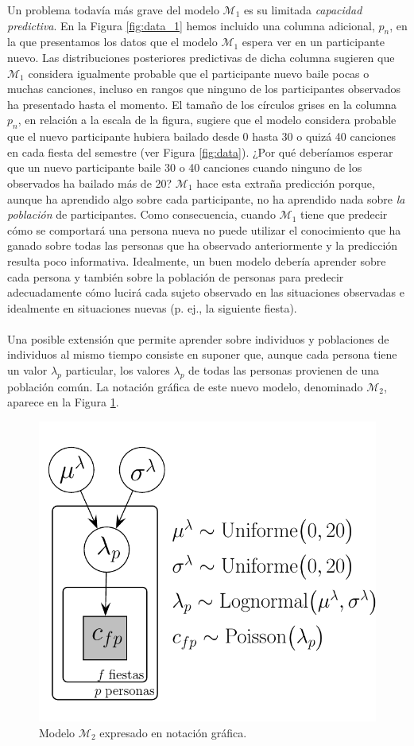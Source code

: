 \documentclass{article}
\begin{document}
\indent Un problema todavía más grave del modelo $\mathcal M_1$ es su limitada \emph{capacidad predictiva}. En la Figura \ref{fig:data_1} hemos incluido una columna adicional, $p_n$, en la que presentamos los datos que el modelo $\mathcal M_1$ espera ver en un participante nuevo. Las distribuciones posteriores predictivas de dicha columna sugieren que $\mathcal M_1$ considera igualmente probable que el participante nuevo baile pocas o muchas canciones, incluso en rangos que ninguno de los participantes observados ha presentado hasta el momento. El tamaño de los círculos grises en la columna $p_n$, en relación a la escala de la figura, sugiere que el modelo considera probable que el nuevo participante hubiera bailado desde 0 hasta 30 o quizá 40 canciones en cada fiesta del semestre (ver Figura \ref{fig:data}).  ¿Por qué deberíamos esperar que un nuevo participante baile 30 o 40 canciones cuando ninguno de los observados ha bailado más de 20? $\mathcal M_1$ hace esta extraña predicción porque, aunque ha aprendido algo sobre cada participante, no ha aprendido nada sobre \emph{la población} de participantes. Como consecuencia, cuando $\mathcal M_1$ tiene que predecir cómo se comportará una persona nueva no puede utilizar el conocimiento que ha ganado sobre todas las personas que ha observado anteriormente y la predicción resulta poco informativa. Idealmente, un buen modelo debería aprender sobre cada persona y también sobre la población de personas para predecir adecuadamente cómo lucirá cada sujeto observado en las situaciones observadas e idealmente en situaciones nuevas (p. ej., la siguiente fiesta).\\\\
\indent Una posible extensión que permite aprender sobre individuos y poblaciones de individuos al mismo tiempo consiste en suponer que, aunque cada persona tiene un valor $\lambda_p$ particular, los valores $\lambda_p$ de todas las personas provienen de una población común. La notación gráfica de este nuevo modelo, denominado $\mathcal M_2$, aparece en la Figura \ref{fig:m_2}.

\begin{figure}[H]
\centerline{\includegraphics[width=.7\textwidth]{m_2.pdf}}
\caption{Modelo $\mathcal M_2$ expresado en notación gráfica.}
\label{fig:m_2}
\end{figure}
\end{document}
